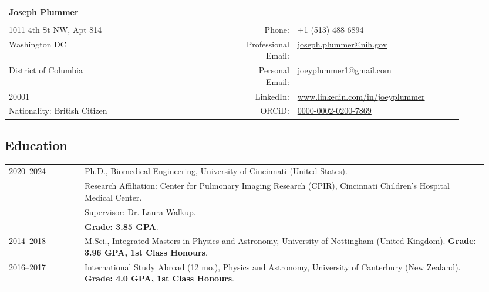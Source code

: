 \documentclass[12pt,]{scrartcl}
\date{}
\begin{document}
\begin{table}[h]
{\def\arraystretch{1.2}\tabcolsep=0pt
\begin{tabular}{p{0.50\linewidth}p{0.05\linewidth}p{0.35\linewidth}}

  \multirow{1}{*}{\LARGE \textbf{Joseph Plummer}} &  &  \\
  
  & & \\
  
  1011 4th St NW, Apt 814 & \multicolumn{1}{r}{Phone:\;\;} & \multicolumn{1}{l}{$+$1 (513) 488 6894} \\
  
  Washington DC & \multicolumn{1}{r}{Professional Email:\;\;} &\multicolumn{1}{l}{\href{joseph.plummer@nih.gov}{joseph.plummer@nih.gov}} \\
  
   District of Columbia & \multicolumn{1}{r}{Personal Email:\;\;} &\multicolumn{1}{l}{\href{joeyplummer1@gmail.com}{joeyplummer1@gmail.com}} \\
  
   20001 & \multicolumn{1}{r}{LinkedIn:\;\;} & \multicolumn{1}{l}{\url{www.linkedin.com/in/joeyplummer}} \\
  
  Nationality: British Citizen%
  & \multicolumn{1}{r}{ORCiD:\;\;} & \multicolumn{1}{l}{\href{https://orcid.org/0000-0002-0200-7869}{0000-0002-0200-7869}} 

\end{tabular}%
}
\end{table}
\subsection{Education}\label{education}


\begin{table}[h]
{\def\arraystretch{1.5}\tabcolsep=0pt
\begin{tabular}{p{0.15\linewidth}p{0.8\linewidth}}

  \multirow{2}{*}[0.85em]{2020--2024} & Ph.D., Biomedical Engineering, University of Cincinnati (United States). \\
  
  & Research Affiliation: Center for Pulmonary Imaging Research (CPIR), Cincinnati Children's Hospital Medical Center. \\
  & Supervisor: Dr. Laura Walkup. \\ & \textbf{Grade: 3.85 GPA}.\\
  
  2014--2018 & M.Sci., Integrated Masters in Physics and Astronomy, University of Nottingham (United Kingdom). \textbf{Grade: 3.96 GPA, 1st Class Honours}. \\

  2016--2017 & International Study Abroad (12 mo.), Physics and Astronomy, University of Canterbury (New Zealand). \textbf{Grade: 4.0 GPA, 1st Class Honours}. 
\end{tabular}%
}
\end{table}
\end{document}
